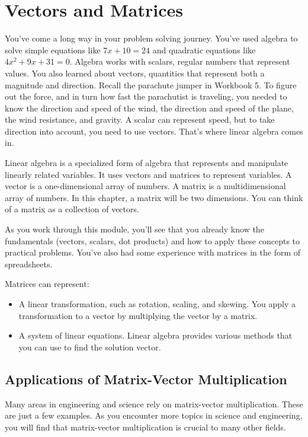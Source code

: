 \chapter{Vectors and Matrices}
You've come a long way in your problem solving journey. You've used algebra to solve simple equations like $7x + 10 = 24$ and quadratic equations like $4x^{2} + 9x + 31 = 0$. Algebra works with scalars, regular numbers that represent values. You also learned about vectors, quantities that represent both a magnitude and direction. Recall the parachute jumper in Workbook 5. To figure out the force, and in turn how fast the parachutist is traveling, you needed to know the direction and speed of the wind, the direction and speed of the plane, the wind resistance, and gravity. A scalar can represent speed, but to take direction into account, you need to use vectors. That's where linear algebra comes in.    

Linear algebra is a specialized form of algebra that represents and manipulate linearly related variables. It uses vectors and matrices to represent variables. A vector is a one-dimensional array of numbers. A matrix is a multidimensional array of numbers. In this chapter, a matrix will be two dimensions. You can think of a matrix as a collection of vectors. 

As you work through this module, you’ll see that you already know the fundamentals (vectors, scalars, dot products) and how to apply these concepts to practical problems. You’ve also had some experience with matrices in the form of spreadsheets. 

Matrices can represent:
\begin{itemize}
\item A linear transformation, such as rotation, scaling, and skewing. You apply a transformation to a vector by multiplying the vector by a matrix.  
\item A system of linear equations. Linear algebra provides various methods that you can use to find the solution vector. 
\end{itemize}

\section{Applications of Matrix-Vector Multiplication}
Many areas in engineering and science rely on matrix-vector multiplication. These are just a few examples. As you encounter more topics in science and engineering, you will find that matrix-vector multiplication is crucial to many other fields.
